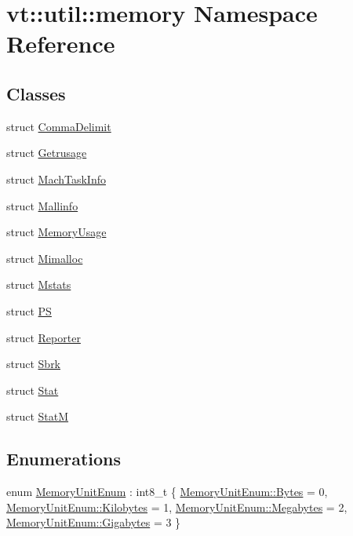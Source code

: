 \hypertarget{namespacevt_1_1util_1_1memory}{}\section{vt\+:\+:util\+:\+:memory Namespace Reference}
\label{namespacevt_1_1util_1_1memory}
\subsection*{Classes}
\begin{DoxyCompactItemize}
\item 
struct \hyperlink{structvt_1_1util_1_1memory_1_1_comma_delimit}{Comma\+Delimit}
\item 
struct \hyperlink{structvt_1_1util_1_1memory_1_1_getrusage}{Getrusage}
\item 
struct \hyperlink{structvt_1_1util_1_1memory_1_1_mach_task_info}{Mach\+Task\+Info}
\item 
struct \hyperlink{structvt_1_1util_1_1memory_1_1_mallinfo}{Mallinfo}
\item 
struct \hyperlink{structvt_1_1util_1_1memory_1_1_memory_usage}{Memory\+Usage}
\item 
struct \hyperlink{structvt_1_1util_1_1memory_1_1_mimalloc}{Mimalloc}
\item 
struct \hyperlink{structvt_1_1util_1_1memory_1_1_mstats}{Mstats}
\item 
struct \hyperlink{structvt_1_1util_1_1memory_1_1_p_s}{PS}
\item 
struct \hyperlink{structvt_1_1util_1_1memory_1_1_reporter}{Reporter}
\item 
struct \hyperlink{structvt_1_1util_1_1memory_1_1_sbrk}{Sbrk}
\item 
struct \hyperlink{structvt_1_1util_1_1memory_1_1_stat}{Stat}
\item 
struct \hyperlink{structvt_1_1util_1_1memory_1_1_stat_m}{StatM}
\end{DoxyCompactItemize}
\subsection*{Enumerations}
\begin{DoxyCompactItemize}
\item 
enum \hyperlink{namespacevt_1_1util_1_1memory_a64df3d84293b34009f78e2a1db2f9bb6}{Memory\+Unit\+Enum} \+: int8\+\_\+t \{ \hyperlink{namespacevt_1_1util_1_1memory_a64df3d84293b34009f78e2a1db2f9bb6a600e754f49b68aa0fc90a9cd64eb7051}{Memory\+Unit\+Enum\+::\+Bytes} = 0, 
\hyperlink{namespacevt_1_1util_1_1memory_a64df3d84293b34009f78e2a1db2f9bb6aa3a6c675a174320497f3bed7e8dc3329}{Memory\+Unit\+Enum\+::\+Kilobytes} = 1, 
\hyperlink{namespacevt_1_1util_1_1memory_a64df3d84293b34009f78e2a1db2f9bb6a2276a1b157f2813f3b65d04c0b1c56f6}{Memory\+Unit\+Enum\+::\+Megabytes} = 2, 
\hyperlink{namespacevt_1_1util_1_1memory_a64df3d84293b34009f78e2a1db2f9bb6af6f7ad0fd5914138fb449b9011c8de7a}{Memory\+Unit\+Enum\+::\+Gigabytes} = 3
 \}
\end{DoxyCompactItemize}

